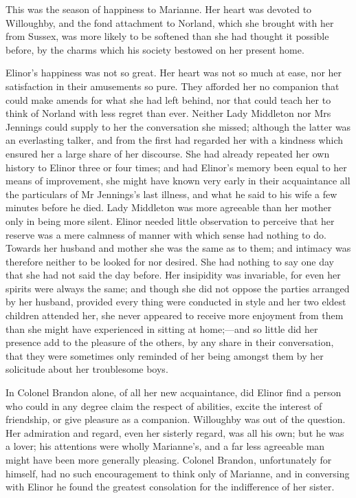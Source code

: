 This was the season of happiness to Marianne. Her heart was devoted to Willoughby, and the fond attachment to Norland, which she brought with her from Sussex, was more likely to be softened than she had thought it possible before, by the charms which his society bestowed on her present home.

Elinor’s happiness was not so great. Her heart was not so much at ease, nor her satisfaction in their amusements so pure. They afforded her no companion that could make amends for what she had left behind, nor that could teach her to think of Norland with less regret than ever. Neither Lady Middleton nor Mrs Jennings could supply to her the conversation she missed; although the latter was an everlasting talker, and from the first had regarded her with a kindness which ensured her a large share of her discourse. She had already repeated her own history to Elinor three or four times; and had Elinor’s memory been equal to her means of improvement, she might have known very early in their acquaintance all the particulars of Mr Jennings’s last illness, and what he said to his wife a few minutes before he died. Lady Middleton was more agreeable than her mother only in being more silent. Elinor needed little observation to perceive that her reserve was a mere calmness of manner with which sense had nothing to do. Towards her husband and mother she was the same as to them; and intimacy was therefore neither to be looked for nor desired. She had nothing to say one day that she had not said the day before. Her insipidity was invariable, for even her spirits were always the same; and though she did not oppose the parties arranged by her husband, provided every thing were conducted in style and her two eldest children attended her, she never appeared to receive more enjoyment from them than she might have experienced in sitting at home;—and so little did her presence add to the pleasure of the others, by any share in their conversation, that they were sometimes only reminded of her being amongst them by her solicitude about her troublesome boys.

In Colonel Brandon alone, of all her new acquaintance, did Elinor find a person who could in any degree claim the respect of abilities, excite the interest of friendship, or give pleasure as a companion. Willoughby was out of the question. Her admiration and regard, even her sisterly regard, was all his own; but he was a lover; his attentions were wholly Marianne’s, and a far less agreeable man might have been more generally pleasing. Colonel Brandon, unfortunately for himself, had no such encouragement to think only of Marianne, and in conversing with Elinor he found the greatest consolation for the indifference of her sister.

